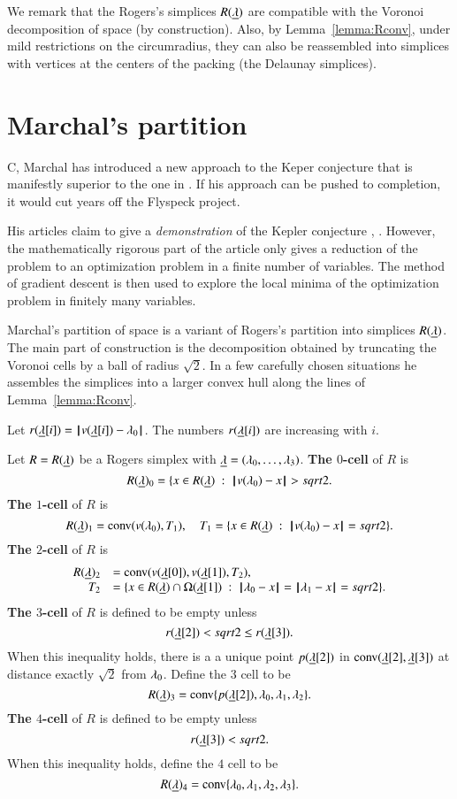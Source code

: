We remark that the Rogers's simplices $R({\underline{\lambda}})$ are compatible with the Voronoi
decomposition of space (by construction).  Also, by Lemma~\ref{lemma:Rconv}, under
mild restrictions on the circumradius, they can also be reassembled into simplices
with vertices at the centers of the packing (the Delaunay simplices).  

\section{Marchal's partition}

C, Marchal has introduced a new approach to the Keper conjecture that is manifestly superior to the one in \cite{Hales:2006:DCG}.  If his approach can be pushed
to completion, it would cut years off the Flyspeck project.

His articles claim to give
a {\it demonstration} of the Kepler conjecture \cite{marchal:2007}, \cite{marchal:2008}.  However, the
mathematically rigorous part of the article only gives a reduction
of the problem to an optimization problem in a finite number of
variables.  The method of gradient descent is then used to explore
the local minima of the optimization problem in finitely many variables.

Marchal's partition of space is a variant of Rogers's partition into simplices
$R({\underline{\lambda}})$.  The main part of construction is 
the decomposition obtained by truncating the Voronoi cells
by a ball of radius $\sqrt2$.  In a few carefully chosen situations he assembles the simplices
into a larger convex hull along the lines of Lemma~\ref{lemma:Rconv}.

Let $r({\underline{\lambda}}[i]) = {\hskip0.1em|\hskip-0.15em|\hskip0.1em}v({\underline{\lambda}}[i]) - \lambda_0{\hskip0.1em|\hskip-0.15em|\hskip0.1em}$.  The numbers $r({\underline{\lambda}}[i])$ are increasing with $i$.

\begin{definition} Let $R=R({\underline{\lambda}})$ be a Rogers simplex with ${\underline{\lambda}}=(\lambda_0,\ldots,\lambda_3)$.
\hfill\break\smallskip  
{\bf The $0$-cell} of $R$ is
$$
R({\underline{\lambda}})_0 = \{x\in R({\underline{\lambda}}) \ :\  {\hskip0.1em|\hskip-0.15em|\hskip0.1em}v(\lambda_0) - x{\hskip0.1em|\hskip-0.15em|\hskip0.1em} > sqrt2.
$$
\bigskip
{\bf The $1$-cell} of $R$ is 
$$
R({\underline{\lambda}})_1 = {\operatorname{conv}}(v(\lambda_0),T_1),\quad T_1 = \{x \in R({\underline{\lambda}}) \ :\  {\hskip0.1em|\hskip-0.15em|\hskip0.1em}v(\lambda_0) - x{\hskip0.1em|\hskip-0.15em|\hskip0.1em}= sqrt2\}.
$$
\bigskip
{\bf The $2$-cell} of $R$ is
$$
\begin{array}{rll}
R({\underline{\lambda}})_2 &= {\operatorname{conv}}(v({\underline{\lambda}}[0]),v({\underline{\lambda}}[1]),T_2),\quad \\
  T_2 &= \{x \in R({\underline{\lambda}})\cap \Omega({\underline{\lambda}}[1]) \ :\  {\hskip0.1em|\hskip-0.15em|\hskip0.1em}\lambda_0 - x{\hskip0.1em|\hskip-0.15em|\hskip0.1em}={\hskip0.1em|\hskip-0.15em|\hskip0.1em}\lambda_1 - x{\hskip0.1em|\hskip-0.15em|\hskip0.1em} =sqrt2\}.
\end{array}
$$
\bigskip
{\bf The $3$-cell} of $R$ is defined to be empty unless 
$$
r({\underline{\lambda}}[2]) <sqrt2 \le r({\underline{\lambda}}[3]).
$$
When this inequality holds,
there is a a unique point $p({\underline{\lambda}}[2])$ in
${\operatorname{conv}}({\underline{\lambda}}[2],{\underline{\lambda}}[3])$ at distance exactly $\sqrt2$ from $\lambda_0$.  
Define the $3$ cell to be
$$
R({\underline{\lambda}})_3 = {\operatorname{conv}}\{p({\underline{\lambda}}[2]),\lambda_0,\lambda_1,\lambda_2\}.
$$
\bigskip
{\bf The $4$-cell} of $R$ is defined to be empty unless
$$
r({\underline{\lambda}}[3]) <sqrt2.
$$
When this inequality holds, define the $4$ cell to be
$$
R({\underline{\lambda}})_4 = {\operatorname{conv}}\{\lambda_0,\lambda_1,\lambda_2,\lambda_3\}.
$$
\end{definition}


